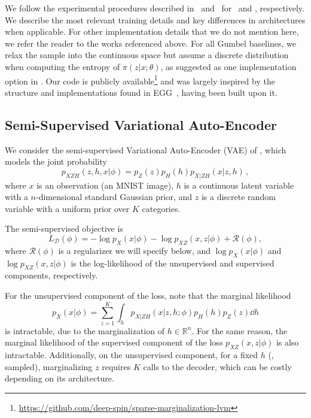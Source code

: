 We follow the experimental procedures described in~\citep{RB19}
and~\citep{Lazaridou2017} for~ and ,
respectively. We describe the most relevant training details and key
differences in architectures when applicable. For other
implementation details that we do not mention here, we refer the
reader to the works referenced above. For all Gumbel baselines, we
relax the sample into the continuous space but assume a discrete
distribution when computing the entropy of $\pi(z |x; \theta)$, as
suggested as one implementation option in \citet{Concrete}. Our code
is publicly available\footnote{
    \url{https://github.com/deep-spin/sparse-marginalization-lvm}} and
was largely inspired by the structure and implementations found in
EGG~\citep{Kharitonov2019}, having been built upon it.

\subsection{Semi-Supervised Variational Auto-Encoder}\label{sec:gen}

\noindent We consider the semi-supervised Variational Auto-Encoder
(VAE) of \citet{KingmaEtAl2014SSVAE}, which models the joint
probability
%
\begin{equation}
    p_{XZH}(z,h,x|\phi)=p_Z(z)p_H(h)p_{X|ZH}(x|z,h)\,,
\end{equation}
%
where $x$ is an
observation (an MNIST image), $h$ is a continuous latent variable
with a $n$-dimensional standard Gaussian prior, and $z$ is a discrete
random variable with a uniform prior over $K$ categories.

The semi-supervised objective is
%
\begin{equation}
    L_{\mathcal D}(\phi) = - \log p_X(x | \phi) - \log p_{XZ}(x, z | \phi) + \mathcal{R}(\phi),
    \label{eq:ss_loss_vae}
\end{equation}
%
where $\mathcal{R}(\phi)$ is a regularizer we will specify below, and
$\log p_X(x | \phi)$ and $\log p_{XZ}(x, z | \phi)$ is the log-likelihood
of the unsupervised and supervised components, respectively.

For the unsupervised component of the loss, note that the marginal likelihood
%
\begin{equation}
    p_X(x | \phi) = \sum_{z=1}^K \int_h p_{X|ZH}(x | z, h; \phi)p_H(h)p_Z(z) \dd h
\end{equation}
%
is intractable, due to the marginalization of $h \in \mathbb R^n$.
For the same reason, the marginal likelihood of the supervised
component of the loss $p_{XZ}(x, z | \phi)$ is also intractable.
Additionally, on the unsupervised component, for a fixed $h$ (\eg,
sampled), marginalizing $z$ requires $K$ calls to the decoder, which
can be costly depending on its architecture.

